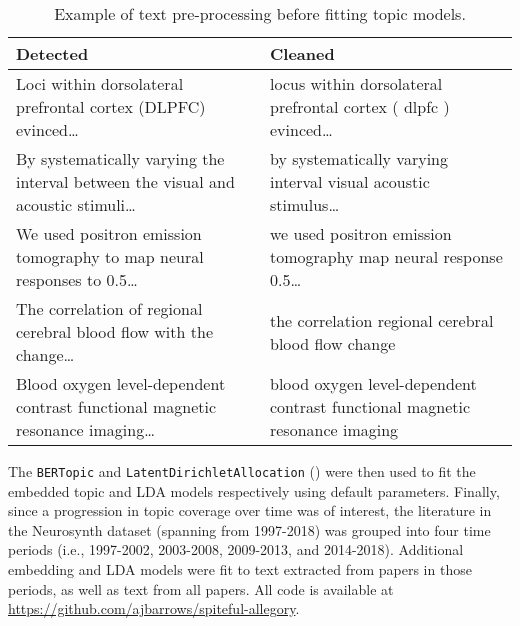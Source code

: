 \begin{table*}[]
	\tiny
	\begin{tabular}{ll}
		\hline
		\textbf{Detected}                                                               & \textbf{Cleaned}                                                            \\ \hline
		Loci within dorsolateral prefrontal cortex (DLPFC) evinced…                     & locus within dorsolateral prefrontal cortex ( dlpfc ) evinced…              \\
		By systematically varying the interval between the visual and acoustic stimuli… & by systematically varying interval visual acoustic stimulus…                \\
		We used positron emission tomography to map neural responses to 0.5…            & we used positron emission tomography map neural response 0.5…               \\
		The correlation of regional cerebral blood flow with the change…                & the correlation regional cerebral blood flow change                         \\
		Blood oxygen level-dependent contrast functional magnetic resonance imaging…    & blood oxygen level-dependent contrast functional magnetic resonance imaging
	\end{tabular}
	\caption{Example of text pre-processing before fitting topic models.}
	\label{tab:cleaned}
\end{table*}




The \texttt{BERTopic} and \texttt{LatentDirichletAllocation} (\cite{PedregosaEtAl2011}) were then used to fit the embedded topic and LDA models respectively using default parameters. Finally, since a progression in topic coverage over time was of interest, the literature in the Neurosynth dataset (spanning from 1997-2018) was grouped into four time periods (i.e., 1997-2002, 2003-2008, 2009-2013, and 2014-2018). Additional embedding and LDA models were fit to text extracted from papers in those periods, as well as text from all papers. All code is available at \href{https://github.com/ajbarrows/spiteful-allegory}{https://github.com/ajbarrows/spiteful-allegory}.





